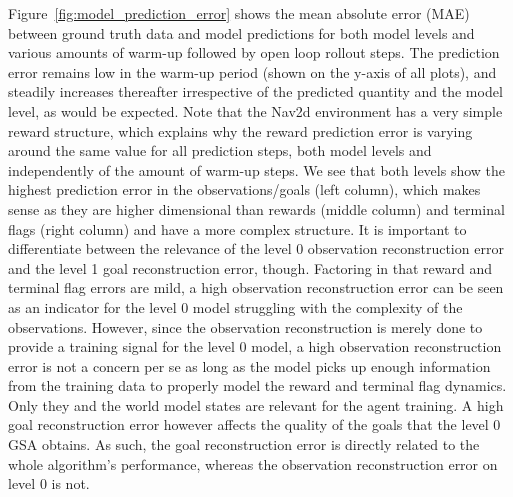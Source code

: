 \documentclass{article}
\begin{document}
Figure~\ref{fig:model_prediction_error} shows the mean absolute error (MAE) between ground truth data and model predictions for both model levels and various amounts of warm-up followed by open loop rollout steps. 
The prediction error remains low in the warm-up period (shown on the y-axis of all plots), and steadily increases thereafter irrespective of the predicted quantity and the model level, as would be expected.
Note that the Nav2d environment has a very simple reward structure, which explains why the reward prediction error is varying around the same value for all prediction steps, both model levels and independently of the amount of warm-up steps.
We see that both levels show the highest prediction error in the observations/goals (left column), which makes sense as they are higher dimensional than rewards (middle column) and terminal flags (right column) and have a more complex structure.
It is important to differentiate between the relevance of the level 0 observation reconstruction error and the level 1 goal reconstruction error, though. 
Factoring in that reward and terminal flag errors are mild, a high observation reconstruction error can be seen as an indicator for the level 0 model struggling with the complexity of the observations. However, since the observation reconstruction is  merely done to provide a training signal for the level 0 model, a high observation reconstruction error is not a concern per se as long as the model picks up enough information from the training data to properly model the reward and terminal flag dynamics. Only they and the world model states are relevant for the agent training. A high goal reconstruction error however affects the quality of the goals that the level 0 GSA obtains. As such, the goal reconstruction error is directly related to the whole algorithm's performance, whereas the observation reconstruction error on level 0 is not.
\end{document}
